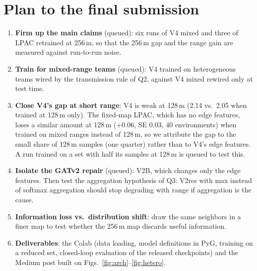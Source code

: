 \documentclass{article}
\begin{document}
\section{Plan to the final submission}
\begin{enumerate}\setlength\itemsep{1pt}
\item \textbf{Firm up the main claims} (queued): six runs of V4 mixed and three of LPAC retrained at 256\,m, so that the 256\,m gap and the range gain are measured against run-to-run noise.
\item \textbf{Train for mixed-range teams} (queued): V4 trained on heterogeneous teams wired by the transmission rule of Q2, against V4 mixed rewired only at test time.
\item \textbf{Close V4's gap at short range}: V4 is weak at 128\,m (2.14 vs.\ 2.05 when trained at 128\,m only). The fixed-map LPAC, which has no edge features, loses a similar amount at 128\,m ($+0.06$, SE 0.03, 40 environments) when trained on mixed ranges instead of 128\,m, so we attribute the gap to the small share of 128\,m samples (one quarter) rather than to V4's edge features. A run trained on a set with half its samples at 128\,m is queued to test this.
\item \textbf{Isolate the GATv2 repair} (queued): V2B, which changes only the edge features. Then test the aggregation hypothesis of Q3: V2res with max instead of softmax aggregation should stop degrading with range if aggregation is the cause.
\item \textbf{Information loss vs.\ distribution shift}: draw the same neighbors in a finer map to test whether the 256\,m map discards useful information.
\item \textbf{Deliverables}: the Colab (data loading, model definitions in PyG, training on a reduced set, closed-loop evaluation of the released checkpoints) and the Medium post built on Figs.~\ref{fig:arch}--\ref{fig:hetero}.
\end{enumerate}


\footnotesize\setlength{\bibsep}{1pt}

\end{document}
